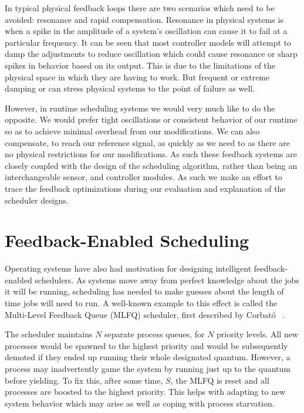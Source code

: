 In typical physical feedback loops there are two scenarios which need to be 
avoided: resonance and rapid compensation. Resonance in physical systems is 
when a spike in the amplitude of a system's oscillation can cause it to fail at 
a particular frequency. It can be seen that most controller 
models will attempt to damp the adjustments to reduce oscillation which could 
cause resonance or sharp spikes in behavior based on its output. This is due to 
the limitations of the physical space in which they are having to work. But 
frequent or extreme damping or can stress physical systems to the point of
failure as well.

However, in runtime scheduling systems we would very much like to do the 
opposite. We would prefer tight oscillations or consistent behavior of our 
runtime so as to achieve minimal overhead from our modifications. We can also 
compensate, to reach our reference signal, as quickly as we need to as there 
are no physical restrictions for our modifications.
As such these feedback systems are closely coupled with the design of the 
scheduling algorithm, rather than being an interchangeable sensor, and controller
modules. As such we make an effort to trace the feedback optimizations during
our evaluation and explanation of the scheduler designs.


\section{Feedback-Enabled Scheduling}

Operating systems have also had motivation for designing intelligent 
feedback-enabled schedulers. As systems move away from perfect knowledge about 
the jobs it will be running, scheduling has needed to make guesses about the 
length of time jobs will need to run. A well-known example to this effect is
called the Multi-Level Feedback Queue (MLFQ) scheduler, first described by 
Corbat{\'o} \etal~\cite{corbato1962experimental,ArpaciDusseau14Book}.

The scheduler maintains $N$ separate process queues, for $N$ priority levels. 
All new processes would be spawned to the highest priority and would be 
subsequently demoted if they ended up running their whole designated quantum. 
However, a process may inadvertently game the system by running just up to the
quantum before yielding. To fix this, after some time, $S$, the MLFQ is reset 
and all processes are boosted to the highest priority. This helps with adapting 
to new system behavior which may arise as well as coping with process 
starvation.

